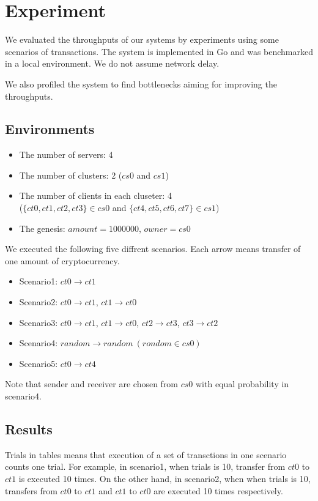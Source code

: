 \documentclass[a4paper, oneside]{discothesis}
\begin{document}
\chapter{Experiment}
We evaluated the throughputs of our systems by experiments using some scenarios of transactions.
The system is implemented in Go and was benchmarked in a local environment.
We do not assume network delay.

We also profiled the system to find bottlenecks aiming for improving the throughputs.

\section{Environments}
\begin{itemize}
    \item The number of servers: 4
    \item The number of clusters: 2 ($cs0$ and $cs1$)
    \item The number of clients in each cluseter: 4\\
        ($\{ct0, ct1, ct2, ct3\} \in cs0$ and $\{ct4, ct5, ct6, ct7\} \in cs1$)
    \item The genesis: $amount = 1000000$, $owner = cs0$
\end{itemize}

We executed the following five diffrent scenarios.
Each arrow means transfer of one amount of cryptocurrency.
\begin{itemize}
    \item Scenario1: $ct0 \rightarrow ct1$
    \item Scenario2: $ct0 \rightarrow ct1$, $ct1 \rightarrow ct0$
    \item Scenario3: $ct0 \rightarrow ct1$, $ct1 \rightarrow ct0$, $ct2 \rightarrow ct3$, $ct3 \rightarrow ct2$
    \item Scenario4: $random \rightarrow random~(rondom \in cs0)$
    \item Scenario5: $ct0 \rightarrow ct4$
\end{itemize}
Note that sender and receiver are chosen from $cs0$ with equal probability in scenario4.

\section{Results}

Trials in tables means that execution of a set of transctions in one scenario counts one trial.
For example, in scenario1, when trials is 10, transfer from $ct0$ to $ct1$ is executed 10 times.
On the other hand, in scenario2, when when trials is 10, transfers from $ct0$ to $ct1$
and $ct1$ to $ct0$ are executed 10 times respectively.
\end{document}
